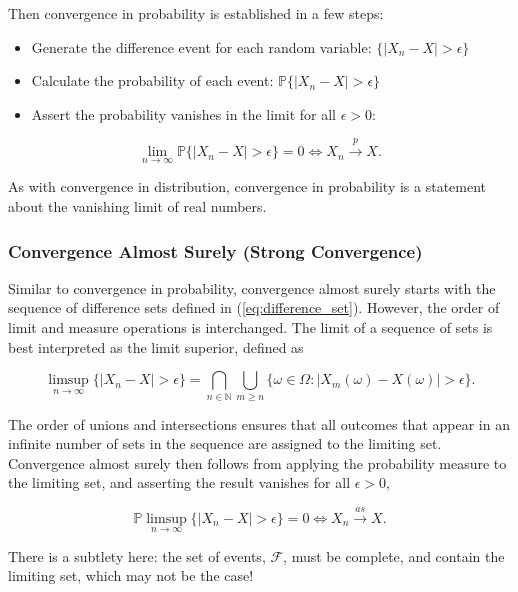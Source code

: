 \documentclass[12pt, twoside, draft]{article}
\begin{document}
Then convergence in probability is established in a few steps:
\begin{itemize}[noitemsep]
\item Generate the difference event for each random variable: $\{| X_n - X| > \epsilon \}$ 
\item Calculate the probability of each event: $\mathbb{P}\{| X_n - X| > \epsilon \}$
\item Assert the probability vanishes in the limit for all $\epsilon > 0$:
\end{itemize}
\begin{equation}
\lim_{n\rightarrow \infty} \mathbb{P}\{|X_n - X| > \epsilon\} = 0 \Leftrightarrow X_n \stackrel{p}{\longrightarrow} X.
\end{equation}

As with convergence in distribution, convergence in probability is a statement about the vanishing limit of real numbers.

\subsubsection{Convergence Almost Surely (Strong Convergence)}\label{sec:convergence_almost_surely}

Similar to convergence in probability, convergence almost surely starts with the sequence of difference sets defined in (\ref{eq:difference_set}).  However, the order of limit and measure operations is interchanged.  The limit of a sequence of sets is best interpreted as the limit superior, defined as

\begin{equation}
\limsup_{n\rightarrow \infty}\{  |X_n - X| > \epsilon \} = \bigcap_{n\in\mathbb{N}} \bigcup_{m \geq n} \{ \omega \in \Omega : |X_m(\omega) - X(\omega)| > \epsilon \}.
\end{equation}

The order of unions and intersections ensures that all outcomes that appear in an infinite number of sets in the sequence are assigned to the limiting set.  Convergence almost surely then follows from applying the probability measure to the limiting set, and asserting the result vanishes for all $\epsilon > 0$,

\begin{equation}
\mathbb{P} \limsup_{n\rightarrow \infty} \{  |X_n - X| > \epsilon \} = 0 \Leftrightarrow X_n \stackrel{as}{\longrightarrow} X.
\end{equation}

There is a subtlety here: the set of events, $\mathcal{F}$, must be complete, and contain the limiting set, which may not be the case!
\end{document}
